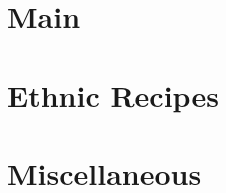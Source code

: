 \documentclass[12pt]{memoir} %
\begin{document}

\part{Main}

















\part{Ethnic Recipes}






%

\part{Miscellaneous}


\printindex
\end{document}
